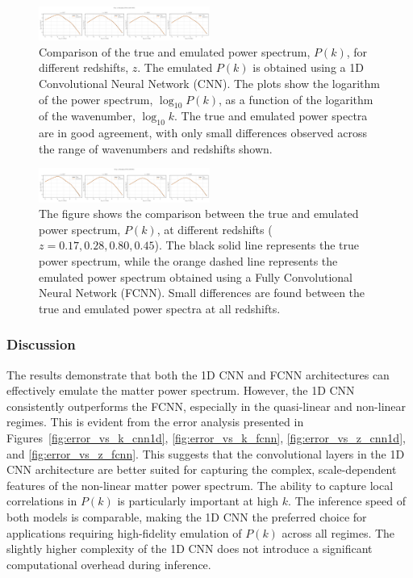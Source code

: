\documentclass[twocolumn]{aastex631}
\begin{document}
\begin{figure}[h]
    \centering
    \includegraphics[width=0.5\textwidth]{Project4/plots/true_vs_emulated_cnn1d_1_1745408311.png}
    \caption{\label{fig:true_vs_emulated_cnn1d}Comparison of the true and emulated power spectrum, $P(k)$, for different redshifts, $z$. The emulated $P(k)$ is obtained using a 1D Convolutional Neural Network (CNN). The plots show the logarithm of the power spectrum, $\log_{10} P(k)$, as a function of the logarithm of the wavenumber, $\log_{10} k$. The true and emulated power spectra are in good agreement, with only small differences observed across the range of wavenumbers and redshifts shown.}
\end{figure}

\begin{figure}[h]
    \centering
    \includegraphics[width=0.5\textwidth]{Project4/plots/true_vs_emulated_fcnn_2_1745408315.png}
    \caption{\label{fig:true_vs_emulated_fcnn}The figure shows the comparison between the true and emulated power spectrum, $P(k)$, at different redshifts ($z=0.17, 0.28, 0.80, 0.45$). The black solid line represents the true power spectrum, while the orange dashed line represents the emulated power spectrum obtained using a Fully Convolutional Neural Network (FCNN). Small differences are found between the true and emulated power spectra at all redshifts.}
\end{figure}

\subsubsection{Discussion}

The results demonstrate that both the 1D CNN and FCNN architectures can effectively emulate the matter power spectrum. However, the 1D CNN consistently outperforms the FCNN, especially in the quasi-linear and non-linear regimes. This is evident from the error analysis presented in Figures~\ref{fig:error_vs_k_cnn1d}, \ref{fig:error_vs_k_fcnn}, \ref{fig:error_vs_z_cnn1d}, and \ref{fig:error_vs_z_fcnn}. This suggests that the convolutional layers in the 1D CNN architecture are better suited for capturing the complex, scale-dependent features of the non-linear matter power spectrum. The ability to capture local correlations in $P(k)$ is particularly important at high $k$. The inference speed of both models is comparable, making the 1D CNN the preferred choice for applications requiring high-fidelity emulation of $P(k)$ across all regimes. The slightly higher complexity of the 1D CNN does not introduce a significant computational overhead during inference.
\end{document}
